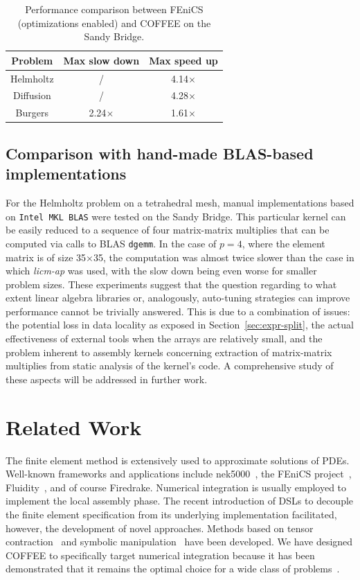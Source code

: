 \documentclass[conference]{IEEEtran}
\begin{document}
\begin{table}[h]
\begin{center}
\begin{tabulary}{1.0\columnwidth}{|C|C|C|}
\hline
Problem & Max slow down & Max speed up \\\hline\hline
Helmholtz & / & 4.14$\times$ \\
Diffusion & / & 4.28$\times$ \\
Burgers & 2.24$\times$ & 1.61$\times$ \\\hline
\end{tabulary}
\end{center}
\caption{Performance comparison between FEniCS (optimizations enabled) and COFFEE on the Sandy Bridge.}
\label{table:comparison-to-FFC-opt}
\end{table}

\subsection{Comparison with hand-made BLAS-based implementations}
\label{sec:perf-eval-blas}
For the Helmholtz problem on a tetrahedral mesh, manual implementations based on \texttt{Intel MKL BLAS} were tested on the Sandy Bridge. This particular kernel can be easily reduced to a sequence of four matrix-matrix multiplies that can be computed via calls to BLAS \texttt{dgemm}. In the case of $p=4$, where the element matrix is of size 35$\times$35, the computation was almost twice slower than the case in which \emph{licm-ap} was used, with the slow down being even worse for smaller problem sizes. These experiments suggest that the question regarding to what extent linear algebra libraries or, analogously, auto-tuning strategies can improve performance cannot be trivially answered. This is due to a combination of issues: the potential loss in data locality as exposed in Section~\ref{sec:expr-split}, the actual effectiveness of external tools when the arrays are relatively small, and the problem inherent to assembly kernels concerning extraction of matrix-matrix multiplies from static analysis of the kernel's code. A comprehensive study of these aspects will be addressed in further work. 


\section{Related Work}
\label{sec:related-work}
The finite element method is extensively used to approximate solutions of PDEs. Well-known frameworks and applications include nek5000~\cite{nek5000-web-page}, the FEniCS project~\cite{Fenics}, Fluidity~\cite{fluidity_manual_v4}, and of course Firedrake. Numerical integration is usually employed to implement the local assembly phase. The recent introduction of DSLs to decouple the finite element specification from its underlying implementation facilitated, however, the development of novel approaches. Methods based on tensor contraction~\cite{FFC-TC} and symbolic manipulation~\cite{Francis} have been developed. We have designed COFFEE to specifically target numerical integration because it has been demonstrated that it remains the optimal choice for a wide class of problems~\cite{quadrature1}.
\end{document}
